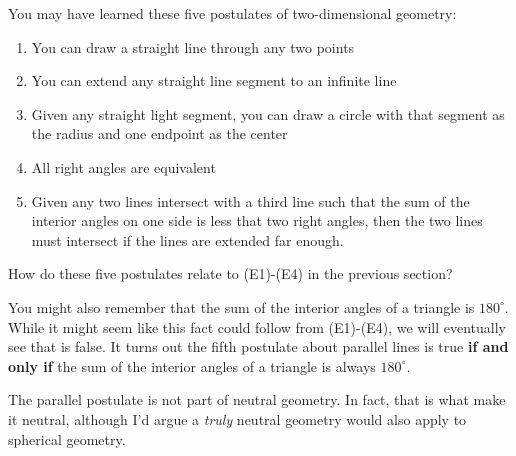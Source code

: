 \documentclass[instructornotes]{ximera}
\begin{document}
You may have learned these five postulates of two-dimensional geometry:
\begin{enumerate}
\item You can draw a straight line through any two points
\item You can extend any straight line segment to an infinite line
\item Given any straight light segment, you can draw a circle with that segment as the radius and one endpoint as the center
\item All right angles are equivalent
\item Given any two lines intersect with a third line such that the sum of the interior angles on one side is less that two right angles, then the two lines must intersect if the lines are extended far enough.
\end{enumerate}

How do these five postulates relate to (E1)-(E4) in the previous section?

You might also remember that the sum of the interior angles of a
triangle is $180^\circ$. While it might seem like this fact could
follow from (E1)-(E4), we will eventually see that is false. It turns
out the fifth postulate about parallel lines is true {\bf if and only
  if} the sum of the interior angles of a triangle is always
$180^\circ$.%

\begin{remark}
  The parallel postulate is not part of neutral geometry. In fact,
  that is what make it neutral, although I'd argue a \emph{truly}
  neutral geometry would also apply to spherical geometry.
\end{remark}
\end{document}
